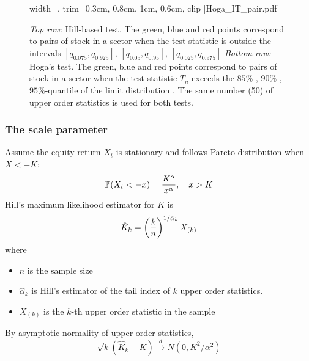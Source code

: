 \documentclass{beamer}
\begin{document}
\begin{frame}
\begin{figure}[htb!]
\begin{minipage}{0.33\linewidth}
      width=\textwidth,
      trim={0.3cm, 0.8cm, 1cm, 0.6cm}, clip
    ]{Hoga_IT_pair.pdf}
  \end{minipage}
  \caption{\tiny
    {\em Top row}: Hill-based test.
    The green, blue and red points correspond to pairs of stock in a sector
    when the test statistic is outside the intervals $[q_{0.075},q_{0.925}]$,
    $[q_{0.05},q_{0.95}]$,  $[q_{0.025},q_{0.975}]$
    {\em Bottom row:} Hoga's test.
    The green, blue and red points correspond to pairs of stock in a sector 
    when the test statistic $T_n$ exceeds the $85\%$-, $90\%$-,
    $95\%$-quantile of the limit distribution .
    The same number (50) of upper order statistics is used for both tests.}
  \label{fig:PairTest} 
\end{figure}
\end{frame}

\begin{frame}
  \frametitle{The scale parameter}
  Assume the equity return $X_t$ is stationary and follows Pareto
  distribution when $X < -K$:
  \[
  \P(X_t < -x) = {
    K^\alpha
    \over
    x^\alpha
  }, \quad x > K
  \]
  Hill's \cite{hill1975simple} maximum likelihood estimator for $K$ is
  \[
  \hat K_k = \left(
  {k \over n}
  \right)^{1/\hat \alpha_k} X_{(k)}
  \]
  where
  \begin{itemize}
  \item $n$ is the sample size
  \item $\hat \alpha_k$ is Hill's estimator of the tail index of $k$
    upper order statistics.
  \item $X_{(k)}$ is the $k$-th upper order statistic in the sample
  \end{itemize}
  By asymptotic normality of upper order statistics,
  \[
  \sqrt k (\hat K_k - K) \overset{d}{\to} N(0, K^2/\alpha^2)
  \]
\end{frame}
\end{document}
